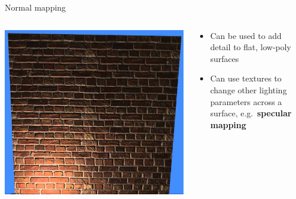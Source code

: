 \begin{frame}{Normal mapping}
\begin{columns}
\begin{column}{0.65\textwidth}
\begin{itemize}
\begin{itemize}
					\end{itemize}
			\end{itemize}
		\end{column}
	\end{columns}
	\pause
	\begin{columns}
		\begin{column}{0.33\textwidth}
			\includegraphics[width=\textwidth]{normal_mapped_wall}
		\end{column}
		\begin{column}{0.65\textwidth}
			\begin{itemize}
				\item Can be used to add detail to flat, low-poly surfaces
				\pause\item Can use textures to change other lighting parameters across a surface,
					e.g.\ \textbf{specular mapping}
			\end{itemize}
		\end{column}
	\end{columns}
\end{frame}

